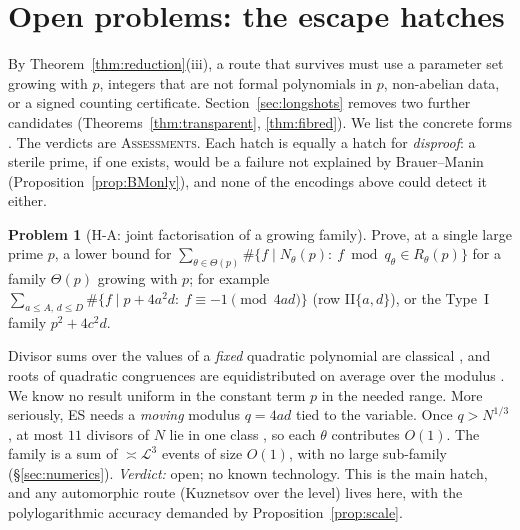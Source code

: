 \documentclass[10pt,reqno]{amsart}
\theoremstyle{definition}
\newtheorem{problem}{Problem}
\numberwithin{equation}{section}
\newcommand{\cL}{\mathcal L}
\newcommand{\status}[1]{\textup{\textsc{#1}}}
\begin{document}
\section{Open problems: the escape hatches}\label{sec:open}
By Theorem~\ref{thm:reduction}(iii), a route that survives must use a
parameter set growing with $p$, integers that are not formal polynomials
in $p$, non-abelian data, or a signed counting certificate. Section~\ref{sec:longshots} removes two
further candidates (Theorems~\ref{thm:transparent}, \ref{thm:fibred}). We list the
concrete forms \cite[\S3]{RT2}. The verdicts are \status{Assessments}. Each
hatch is equally a hatch for \emph{disproof}: a sterile prime, if one
exists, would be a failure not explained by Brauer--Manin
(Proposition~\ref{prop:BMonly}), and none of the encodings above could
detect it either.

\begin{problem}[H-A: joint factorisation of a growing family]
Prove, at a single large prime $p$, a lower bound for
$\sum_{\theta\in\Theta(p)}\#\{f\mid N_\theta(p):\ f\bmod q_\theta\in R_\theta(p)\}$
for a family $\Theta(p)$ growing with $p$; for example
$\sum_{a\le A,\,d\le D}\#\{f\mid p+4a^2d:\ f\equiv-1\pmod{4ad}\}$ (row
II$\{a,d\}$), or the Type~I family $p^2+4c^2d$.
\end{problem}
Divisor sums over the values of a \emph{fixed} quadratic polynomial are
classical \cite{Ho}, and roots of quadratic congruences are equidistributed
on average over the modulus \cite{DFI}. We know no result uniform in the
constant term $p$ in the needed range. More seriously, ES needs a
\emph{moving} modulus $q=4ad$ tied to the variable. Once $q>N^{1/3}$, at
most $11$ divisors of $N$ lie in one class \cite{Le}, so each $\theta$
contributes $O(1)$. The family is a sum of $\asymp\cL^3$ events of size
$O(1)$, with no large sub-family (\S\ref{sec:numerics}). \emph{Verdict:} open;
no known technology. This is the main hatch, and any automorphic route
(Kuznetsov over the level) lives here, with the polylogarithmic accuracy
demanded by Proposition~\ref{prop:scale}.
\end{document}
